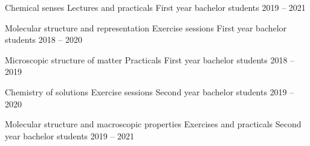 
\begin{cvhonors}

  \cvhonor
  	{Chemical senses}
  	{Lectures and practicals}
  	{First year bachelor students}
  	{2019 -- 2021}

  \cvhonor
    {Molecular structure and representation}
    {Exercise sessions}
    {First year bachelor students}
    {2018 -- 2020}

  \cvhonor
    {Microscopic structure of matter}
    {Practicals}
    {First year bachelor students}
    {2018 -- 2019}

  \cvhonor
  	{Chemistry of solutions}
  	{Exercise sessions}
  	{Second year bachelor students}
  	{2019 -- 2020}

  \cvhonor
    {Molecular structure and macroscopic properties}
    {Exercises and practicals}
    {Second year bachelor students}
    {2019 -- 2021}

\end{cvhonors}
